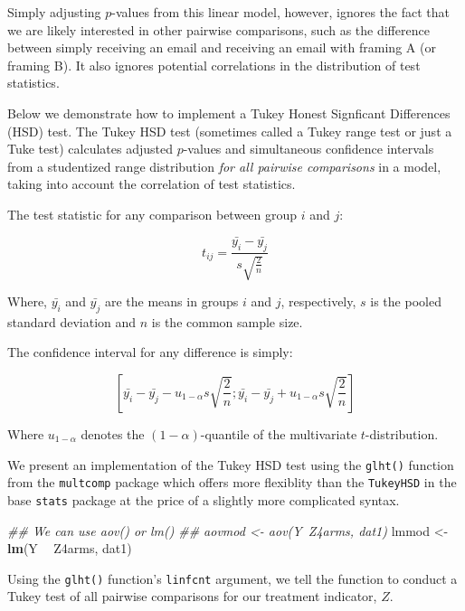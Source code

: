 \documentclass[
  12pt,
]{book}
\newenvironment{Shaded}{\begin{snugshade}}{\end{snugshade}}
\newcommand{\CommentTok}[1]{\textcolor[rgb]{0.56,0.35,0.01}{\textit{#1}}}
\newcommand{\KeywordTok}[1]{\textcolor[rgb]{0.13,0.29,0.53}{\textbf{#1}}}
\newcommand{\NormalTok}[1]{#1}
\newcommand{\OperatorTok}[1]{\textcolor[rgb]{0.81,0.36,0.00}{\textbf{#1}}}
\newcommand{\StringTok}[1]{\textcolor[rgb]{0.31,0.60,0.02}{#1}}
\theoremstyle{definition}
\theoremstyle{definition}
\theoremstyle{definition}
\theoremstyle{remark}
\begin{document}
Simply adjusting \(p\)-values from this linear model, however, ignores
the fact that we are likely interested in other pairwise comparisons,
such as the difference between simply receiving an email and receiving
an email with framing A (or framing B). It also ignores potential
correlations in the distribution of test statistics.

Below we demonstrate how to implement a Tukey Honest Signficant
Differences (HSD) test. The Tukey HSD test (sometimes called a Tukey
range test or just a Tuke test) calculates adjusted \(p\)-values and
simultaneous confidence intervals from a studentized range distribution
\emph{for all pairwise comparisons} in a model, taking into account the
correlation of test statistics.

The test statistic for any comparison between group \(i\) and \(j\):

\[ t_{ij} = \frac{\bar{y_i}-\bar{y_j}}{s\sqrt{\frac{2}{n}}} \]

Where, \(\bar{y_i}\) and \(\bar{y_j}\) are the means in groups \(i\) and
\(j\), respectively, \(s\) is the pooled standard deviation and \(n\) is
the common sample size.

The confidence interval for any difference is simply:

\[ \left[
     \bar{y_i}-\bar{y_j}-u_{1-\alpha}s\sqrt{\frac{2}{n}};\bar{y_i}-\bar{y_j}+u_{1-\alpha}s\sqrt{\frac{2}{n}}\right]
\]

Where \(u_{1-\alpha}\) denotes the \((1-\alpha)\)-quantile of the
multivariate \(t\)-distribution.

We present an implementation of the Tukey HSD test using the
\texttt{glht()} function from the \texttt{multcomp} package which offers
more flexiblity than the \texttt{TukeyHSD} in the base \texttt{stats}
package at the price of a slightly more complicated syntax.

\begin{Shaded}
\begin{Highlighting}[]
\CommentTok{## We can use aov() or lm()}
\CommentTok{## aovmod <- aov(Y~Z4arms, dat1)}
\NormalTok{lmmod <-}\StringTok{ }\KeywordTok{lm}\NormalTok{(Y }\OperatorTok{~}\StringTok{ }\NormalTok{Z4arms, dat1)}
\end{Highlighting}
\end{Shaded}

Using the \texttt{glht()} function's \texttt{linfcnt} argument, we tell
the function to conduct a Tukey test of all pairwise comparisons for our
treatment indicator, \(Z\).
\end{document}
